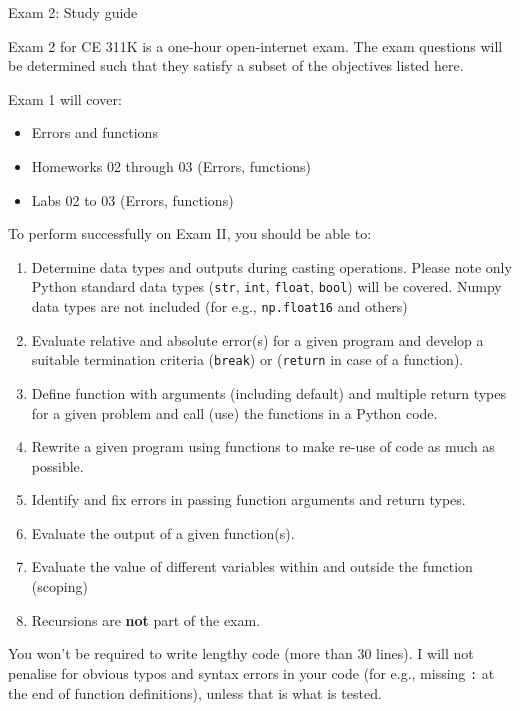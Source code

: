 \documentclass[]{article}
\begin{document}
\begin{center}
\Large Exam 2: Study guide
\end{center}

Exam 2 for CE 311K is a one-hour open-internet exam. The exam questions will be determined such that they satisfy a subset of the objectives listed here.

Exam 1 will cover:
\begin{itemize}
	\item Errors and functions
	\item Homeworks 02 through 03 (Errors, functions)
	\item Labs 02 to 03 (Errors, functions)
\end{itemize}

To perform successfully on Exam II, you should be able to:

\begin{enumerate}
	\item Determine data types and outputs during casting operations. Please note only Python standard data types (\verb|str|, \verb|int|, \verb|float|, \verb|bool|) will be covered. Numpy data types are not included (for e.g., \verb|np.float16| and others)
	\item Evaluate relative and absolute error(s) for a given program and develop  a suitable termination criteria (\verb|break|) or (\verb|return| in case of a function).
	\item Define function with arguments (including default) and multiple return types for a given problem and call (use) the functions in a Python code.
	\item Rewrite a given program using functions to make re-use of code as much as possible.
	\item Identify and fix errors in passing function arguments and return types.
	\item Evaluate the output of a given function(s).
	\item Evaluate the value of different variables within and outside the function (scoping)
	\item Recursions are \textbf{not} part of the exam.
%
%
\end{enumerate}

You won't be required to write lengthy code (more than 30 lines). I will not penalise for obvious typos and syntax errors in your code (for e.g., missing \verb|:| at the end of function definitions), unless that is what is tested.
\end{document}

